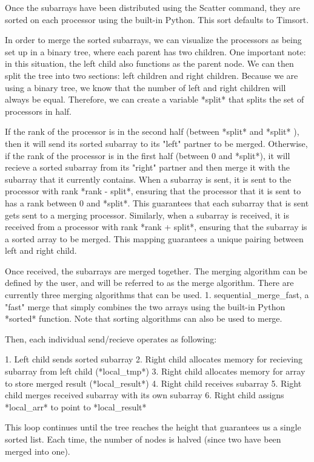 Once the subarrays have been distributed using the Scatter command, they
are sorted on each processor using the built-in Python. This sort
defaults to Timsort.

In order to merge the sorted subarrays, we can visualize the processors
as being set up in a binary tree, where each parent has two children.
One important note: in this situation, the left child also functions as
the parent node. We can then split the tree into two sections: left
children and right children. Because we are using a binary tree, we know
that the number of left and right children will always be equal.
Therefore, we can create a variable *split* that splits the set of
processors in half.

If the rank of the processor is in the second half (between *split* and
*split* ), then it will send its sorted subarray to its "left"
partner to be merged. Otherwise, if the rank of the processor is in the
first half (between 0 and *split*), it will recieve a sorted subarray
from its "right" partner and then merge it with the subarray that it
currently contains. When a subarray is sent, it is sent to the processor
with rank *rank - split*, ensuring that the processor that it is sent to
has a rank between 0 and *split*. This guarantees that each subarray
that is sent gets sent to a merging processor. Similarly, when a
subarray is received, it is received from a processor with rank *rank +
split*, ensuring that the subarray is a sorted array to be merged. This
mapping guarantees a unique pairing between left and right child.

Once received, the subarrays are merged together. The merging algorithm
can be defined by the user, and will be referred to as the merge
algorithm. There are currently three merging algorithms that can be
used. 
1. sequential_merge_fast, a "fast" merge that simply combines
the two arrays using the built-in Python *sorted* function. Note that
sorting algorithms can also be used to merge. 

Then, each individual send/recieve operates as following:

1. Left child sends sorted subarray
2. Right child allocates memory for recieving subarray from left child
   (*local_tmp*)
3. Right child allocates memory for array to store merged result
   (*local_result*)
4. Right child receives subarray
5. Right child merges received subarray with its own subarray
6. Right child assigns *local_arr* to point to *local_result*

This loop continues until the tree reaches the height that guarantees us
a single sorted list. Each time, the number of nodes is halved (since
two have been merged into one).


